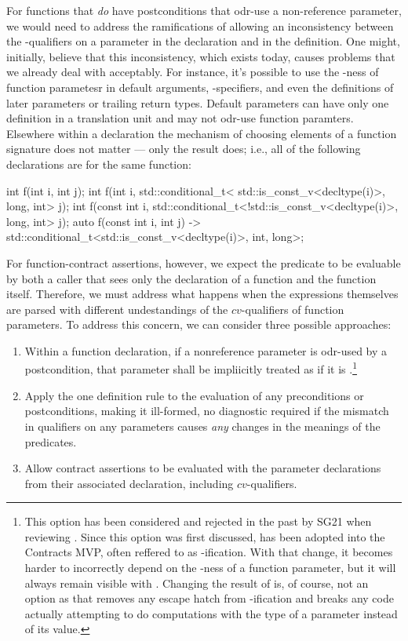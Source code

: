 For functions that \emph{do} have postconditions that odr-use a non-reference parameter, we would need to address the ramifications of allowing an inconsistency between the -qualifiers on a parameter in the declaration and in the definition.  One might, initially, believe that this inconsistency, which exists today, causes problems that we already deal with acceptably.  For instance, it's possible to use the -ness of function parametesr in default arguments, -specifiers, and even the definitions of later parameters or trailing return types.   Default parameters can have only one definition in a translation unit and may not odr-use function paramters.  Elsewhere within a declaration the mechanism of choosing elements of a function signature does not matter --- only the result does; i.e., all of the following declarations are for the same function:
\begin{codeblock}
int f(int i, int j);
int f(int i,       std::conditional_t< std::is_const_v<decltype(i)>, long, int> j);
int f(const int i, std::conditional_t<!std::is_const_v<decltype(i)>, long, int> j);
auto f(const int i, int j) -> std::conditional_t<std::is_const_v<decltype(i)>, int, long>;
\end{codeblock}
For function-contract assertions, however, we expect the predicate to be evaluable by both a caller that sees only the declaration of a function and the function itself.  Therefore, we must address what happens when the expressions themselves are parsed with different undestandings of the $cv$-qualifiers of function parameters.  To address this concern, we can consider three possible approaches:
\renewcommand\labelenumi{V4\alph{enumi}.}
\renewcommand\theenumi\labelenumi
\begin{enumerate}
\item Within a function declaration, if a nonreference parameter is odr-used by a postcondition, that parameter shall be impliicitly treated as if it is .\footnote{This option has been considered and rejected in the past by SG21 when reviewing \cite{P2829R0}. Since this option was first discussed, \cite{P3071R1} has been adopted into the Contracts MVP, often reffered to as -ification.   With that change, it becomes harder to incorrectly depend on the -ness of a function parameter, but it will always remain visible with .  Changing the result of  is, of course, not an option as that removes any escape hatch from -ification and breaks any code actually attempting to do computations with the type of a parameter instead of its value.}

\item Apply the one definition rule to the evaluation of any preconditions or postconditions, making it ill-formed, no diagnostic required if the mismatch in  qualifiers on any parameters causes \emph{any} changes in the meanings of the predicates.
\item Allow contract assertions to be evaluated with the parameter declarations from their associated declaration, including $cv$-qualifiers.
\end{enumerate}
       

